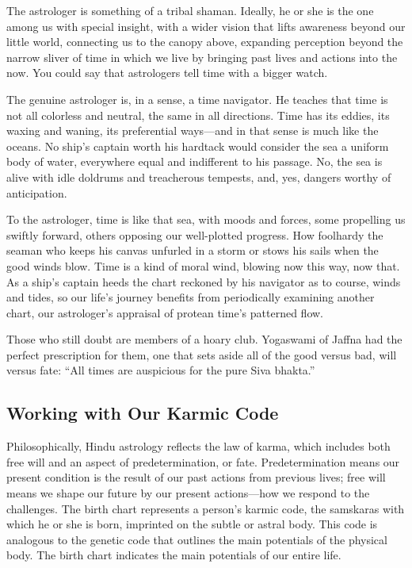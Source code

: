  

The astrologer is something of a tribal shaman. Ideally, he or she is the one among us with special insight, with a wider vision that lifts awareness beyond our little world, connecting us to the canopy above, expanding perception beyond the narrow sliver of time in which we live by bringing past lives and actions into the now. You could say that astrologers tell time with a bigger watch.

 

The genuine astrologer is, in a sense, a time navigator. He teaches that time is not all colorless and neutral, the same in all directions. Time has its eddies, its waxing and waning, its preferential ways—and in that sense is much like the oceans. No ship’s captain worth his hardtack would consider the sea a uniform body of water, everywhere equal and indifferent to his passage. No, the sea is alive with idle doldrums and treacherous tempests, and, yes, dangers worthy of anticipation.

 

To the astrologer, time is like that sea, with moods and forces, some propelling us swiftly forward, others opposing our well-plotted progress. How foolhardy the seaman who keeps his canvas unfurled in a storm or stows his sails when the good winds blow. Time is a kind of moral wind, blowing now this way, now that. As a ship’s captain heeds the chart reckoned by his navigator as to course, winds and tides, so our life’s journey benefits from periodically examining another chart, our astrologer’s appraisal of protean time’s patterned flow.

 

Those who still doubt are members of a hoary club. Yogaswami of Jaffna had the perfect prescription for them, one that sets aside all of the good versus bad, will versus fate: “All times are auspicious for the pure Siva bhakta.”

 

\subsection{Working with Our Karmic Code}

Philosophically, Hindu astrology reflects the law of karma, which includes both free will and an aspect of predetermination, or fate. Predetermination means our present condition is the result of our past actions from previous lives; free will means we shape our future by our present actions—how we respond to the challenges. The birth chart represents a person’s karmic code, the samskaras with which he or she is born, imprinted on the subtle or astral body. This code is analogous to the genetic code that outlines the main potentials of the physical body. The birth chart indicates the main potentials of our entire life.


